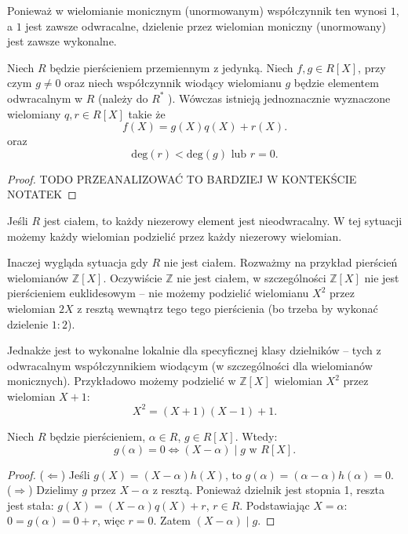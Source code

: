 Ponieważ w wielomianie monicznym (unormowanym) współczynnik ten wynosi $1$, a $1$ jest zawsze odwracalne, dzielenie przez wielomian moniczny (unormowany) jest zawsze wykonalne.

\begin{theorem}
	Niech $R$ będzie pierścieniem przemiennym z jedynką. Niech $f,g \in R\left[ X \right] $, przy czym $g\neq 0$ oraz niech współczynnik wiodący wielomianu $g$ będzie elementem odwracalnym w $R$ (należy do $R^{\ast} $ ). Wówczas istnieją jednoznacznie wyznaczone wielomiany $q,r \in R\left[ X \right] $ takie że
	\[
	f\left( X \right) = g\left( X \right) q\left( X \right) + r\left( X \right) 
	.\] 
	oraz
	\[
	\text{deg}\left(r\right) < \text{deg}\left(g\right) \text{ lub } r = 0
	.\] 
\end{theorem} 
\begin{proof}
	TODO PRZEANALIZOWAĆ TO BARDZIEJ W KONTEKŚCIE NOTATEK 
\end{proof} 
\begin{eg}
	Jeśli $R$ jest ciałem, to każdy niezerowy element jest nieodwracalny. W tej sytuacji możemy każdy wielomian podzielić przez każdy niezerowy wielomian.

	Inaczej wygląda sytuacja gdy $R$ nie jest ciałem. Rozważmy na przykład pierścień wielomianów $\mathbb{Z}\left[ X \right] $. Oczywiście $\mathbb{Z}$ nie jest ciałem, w szczególności $\mathbb{Z}\left[ X \right] $ nie jest pierścieniem euklidesowym -- nie możemy podzielić wielomianu $X^2$ przez wielomian $2X$ z resztą wewnątrz tego tego pierścienia (bo trzeba by wykonać dzielenie $1 : 2$).

	Jednakże jest to wykonalne lokalnie dla specyficznej klasy dzielników -- tych z odwracalnym współczynnikiem wiodącym (w szczególności dla wielomianów monicznych). Przykładowo możemy podzielić w  $\mathbb{Z}\left[ X \right] $ wielomian $X^2$ przez wielomian $X+1$:
	 \[
	X^2 = \left( X+1 \right) \left( X-1 \right) + 1
	.\] 
\end{eg} 
\begin{theorem}[Bézout]
Niech $R$ będzie pierścieniem, $\alpha \in R$, $g \in R[X]$. Wtedy:
\[
g(\alpha) = 0 \iff (X - \alpha) \mid g \text{ w } R[X].
\]
\end{theorem}

\begin{proof}
($\Leftarrow$) Jeśli $g(X) = (X - \alpha)h(X)$, to $g(\alpha) = (\alpha - \alpha)h(\alpha) = 0$. \\
($\Rightarrow$) Dzielimy $g$ przez $X - \alpha$ z resztą. Ponieważ dzielnik jest stopnia 1, reszta jest stała: $g(X) = (X - \alpha)q(X) + r$, $r \in R$. Podstawiając $X = \alpha$: $0 = g(\alpha) = 0 + r$, więc $r = 0$. Zatem $(X - \alpha) \mid g$.
\end{proof}

